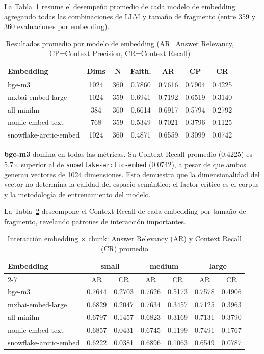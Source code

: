 \documentclass{article}
\begin{document}
La Tabla~\ref{tab:por_embedding} resume el desempeño promedio de cada modelo de
embedding agregando todas las combinaciones de LLM y tamaño de fragmento
(entre 359 y 360 evaluaciones por embedding).

\begin{table}[H]
\centering
\begin{tabular}{|l|c|c|c|c|c|c|}
\hline
\textbf{Embedding} & \textbf{Dims} & \textbf{N} & \textbf{Faith.} & \textbf{AR} & \textbf{CP} & \textbf{CR} \\
\hline
bge-m3                 & 1024 & 360 & 0.7860 & 0.7616 & 0.7904 & 0.4225 \\
mxbai-embed-large      & 1024 & 359 & 0.6941 & 0.7192 & 0.6519 & 0.3140 \\
all-minilm             &  384 & 360 & 0.6614 & 0.6917 & 0.5794 & 0.2792 \\
nomic-embed-text       &  768 & 359 & 0.5349 & 0.7021 & 0.3796 & 0.1125 \\
snowflake-arctic-embed & 1024 & 360 & 0.4871 & 0.6559 & 0.3099 & 0.0742 \\
\hline
\end{tabular}
\caption{Resultados promedio por modelo de embedding (AR=Answer Relevancy, CP=Context Precision, CR=Context Recall)}
\label{tab:por_embedding}
\end{table}

\textbf{bge-m3} domina en todas las métricas. Su Context Recall promedio
(0.4225) es 5.7× superior al de \texttt{snowflake-arctic-embed} (0.0742), a
pesar de que ambos generan vectores de 1024 dimensiones. Esto demuestra que la
dimensionalidad del vector no determina la calidad del espacio semántico: el
factor crítico es el corpus y la metodología de entrenamiento del modelo.

La Tabla~\ref{tab:heatmap} descompone el Context Recall de cada embedding por
tamaño de fragmento, revelando patrones de interacción importantes.

\begin{table}[H]
\centering
\small
\begin{tabular}{|l|c|c|c|c|c|c|}
\hline
\multirow{2}{*}{\textbf{Embedding}} & \multicolumn{2}{c|}{\textbf{small}} & \multicolumn{2}{c|}{\textbf{medium}} & \multicolumn{2}{c|}{\textbf{large}} \\
\cline{2-7}
 & AR & CR & AR & CR & AR & CR \\
\hline
bge-m3                 & 0.7644 & 0.2703 & 0.7626 & 0.5173 & 0.7578 & 0.4906 \\
mxbai-embed-large      & 0.6829 & 0.2047 & 0.7634 & 0.3457 & 0.7125 & 0.3963 \\
all-minilm             & 0.6797 & 0.1457 & 0.6823 & 0.3169 & 0.7131 & 0.3790 \\
nomic-embed-text       & 0.6857 & 0.0431 & 0.6745 & 0.1199 & 0.7491 & 0.1767 \\
snowflake-arctic-embed & 0.6222 & 0.0381 & 0.6896 & 0.1063 & 0.6549 & 0.0787 \\
\hline
\end{tabular}
\caption{Interacción embedding $\times$ chunk: Answer Relevancy (AR) y Context Recall (CR) promedio}
\label{tab:heatmap}
\end{table}
\end{document}
